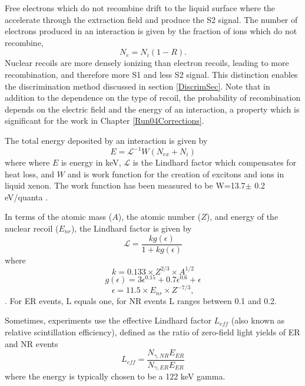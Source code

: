 \documentclass[a4paper,12pt]{article}
\begin{document}
{%

Free electrons which do not recombine drift to the liquid surface where the accelerate through the extraction field and produce the S2 signal.  The number of electrons produced in an interaction is given by the fraction of ions which do not recombine,
\begin{equation}
N_e = N_i(1-R).
\end{equation}
Nuclear recoils are more densely ionizing than electron recoils, leading to more recombination, and therefore more S1 and less S2 signal.  This distinction enables the discrimination method discussed in section \ref{DiscrimSec}.  Note that in addition to the dependence on the type of recoil, the probability of recombination depends on the electric field and the energy of an interaction, a property which is significant for the work in Chapter \ref{Run04Corrections}.

The total energy deposited by an interaction is given by
\begin{equation} \label{EnergyOne}
E = \mathcal{L}^{-1} W (N_{ex} + N_i)
\end{equation}
where where $E$ is energy in keV, $\mathcal{L}$ is the Lindhard factor which compensates for heat loss, and $W$ and is work function for the creation of excitons and ions in liquid xenon. The work function has been measured to be  W=13.7$\pm$ 0.2 eV/quanta \cite{Dahl}. 

In terms of the atomic mass ($A$), the atomic number ($Z$), and energy of the nuclear recoil ($E_{nr}$), the Lindhard factor is given by 
\begin{equation}
\mathcal{L}=\frac{kg(\epsilon)}{1 + kg(\epsilon)}
\end{equation}
where
\begin{equation}
k=0.133 \times Z^{2/3} \times A^{1/2}
\end{equation}
\begin{equation}
g(\epsilon)=3\epsilon^{0.15} + 0.7\epsilon^{0.6} +\epsilon
\end{equation}
\begin{equation}
\epsilon = 11.5 \times E_{nr} \times Z^{-7/3},
\end{equation}.  For ER events, L equals one, for NR events L ranges between 0.1 and 0.2.

Sometimes, experiments use the effective Lindhard factor $L_{eff}$ (also known as relative scintillation efficiency), defined as the ratio of zero-field light yields of ER and NR events
\begin{equation}
L_{eff} = \frac{N_{\gamma,NR} E_{ER}}{N_{\gamma,ER} E_{ER}}
\end{equation}
where the energy is typically chosen to be a 122 keV gamma.

}
\end{document}
